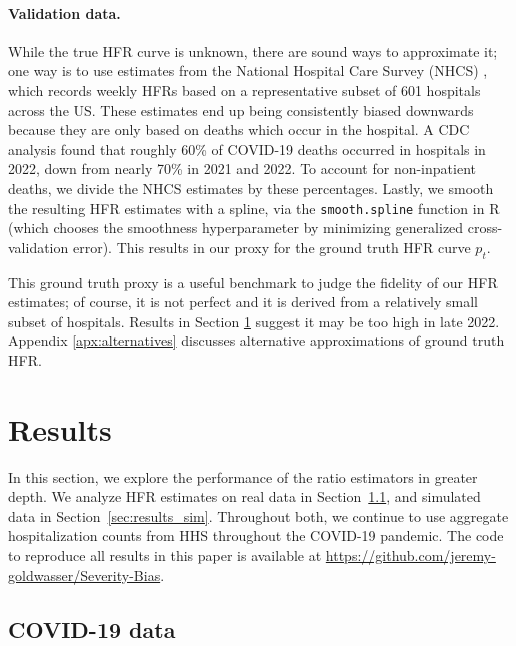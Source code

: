 \documentclass{article}
\begin{document}
\paragraph{Validation data.}

While the true HFR curve is unknown, there are sound ways to approximate it; one  
way is to use estimates from the National Hospital Care Survey (NHCS)
\citep{NHCS2023}, which records weekly HFRs based on a representative subset 
of 601 hospitals across the US. These estimates end up being consistently
biased downwards because they are only based on deaths which occur in the
hospital. A CDC analysis \citep{ahmad2023covid} found that roughly 60\% of
COVID-19 deaths occurred in hospitals in 2022, down from nearly 70\% in 2021 and
2022. To account for non-inpatient deaths, we divide the NHCS estimates by these
percentages. Lastly, we smooth the resulting HFR estimates with a spline, via
the \texttt{smooth.spline} function in R (which chooses the smoothness
hyperparameter by minimizing generalized cross-validation error). This results 
in our proxy for the ground truth HFR curve $p_t$.  

This ground truth proxy is a useful benchmark to judge the fidelity of our HFR
estimates; of course, it is not perfect and it is derived from a relatively
small subset of hospitals. Results in Section \ref{sec:results} suggest it may
be too high in late 2022. Appendix \ref{apx:alternatives} discusses alternative  
approximations of ground truth HFR.   

\section{Results}
\label{sec:results}

In this section, we explore the performance of the ratio estimators in greater depth. 
We analyze HFR estimates on real data in Section~\ref{sec:results_real}, and simulated data in Section~\ref{sec:results_sim}. Throughout both, we continue to use aggregate hospitalization counts from HHS throughout the COVID-19 pandemic. 
The code to reproduce all results in this paper is available at
\url{https://github.com/jeremy-goldwasser/Severity-Bias}. 

\subsection{COVID-19 data}\label{sec:results_real}
\end{document}
